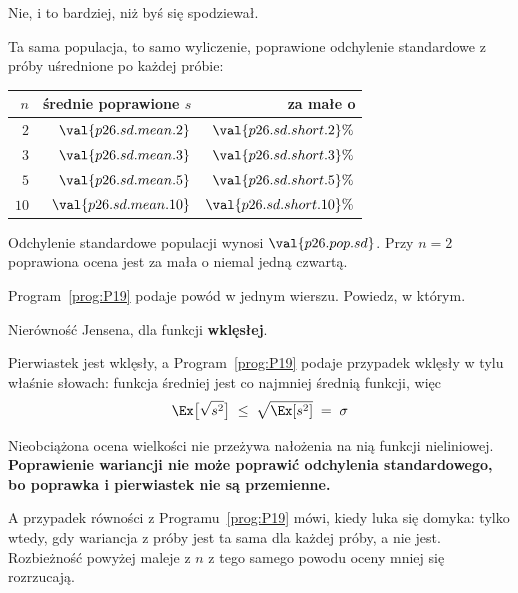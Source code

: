 \begin{fr}
\begin{ansblock}
Nie, i to bardziej, niż byś się spodziewał.
\end{ansblock}

Ta sama populacja, to samo wyliczenie, poprawione odchylenie standardowe z
próby uśrednione po każdej próbie:

\begin{center}
\begin{tabular}{rrr}
\toprule
$n$ & średnie poprawione $s$ & za małe o \\
\midrule
$2$ & $\val{p26.sd.mean.2}$ & $\val{p26.sd.short.2}\%$ \\
$3$ & $\val{p26.sd.mean.3}$ & $\val{p26.sd.short.3}\%$ \\
$5$ & $\val{p26.sd.mean.5}$ & $\val{p26.sd.short.5}\%$ \\
$10$ & $\val{p26.sd.mean.10}$ & $\val{p26.sd.short.10}\%$ \\
\bottomrule
\end{tabular}
\end{center}

Odchylenie standardowe populacji wynosi $\val{p26.pop.sd}$. Przy $n = 2$
poprawiona ocena jest za mała o niemal jedną czwartą.

Program~\ref{prog:P19} podaje powód w jednym wierszu. Powiedz, w którym.
\dotline
\nextframe
\end{fr}

\begin{fr}
\begin{ansblock}
Nierówność Jensena, dla funkcji \textbf{wklęsłej}.
\end{ansblock}

Pierwiastek jest wklęsły, a Program~\ref{prog:P19} podaje przypadek wklęsły w
tylu właśnie słowach: funkcja średniej jest co najmniej średnią funkcji, więc
\[ \Ex\bigl[\sqrt{s^{2}}\bigr] \;\le\; \sqrt{\Ex[s^{2}]} \;=\; \sigma \]

Nieobciążona ocena wielkości nie przeżywa nałożenia na nią funkcji
nieliniowej. \textbf{Poprawienie wariancji nie może poprawić odchylenia
standardowego, bo poprawka i pierwiastek nie są przemienne.}

A przypadek równości z Programu~\ref{prog:P19} mówi, kiedy luka się domyka:
tylko wtedy, gdy wariancja z próby jest ta sama dla każdej próby, a nie jest.
Rozbieżność powyżej maleje z $n$ z tego samego powodu \dash{} oceny mniej się
rozrzucają.
\end{fr}

